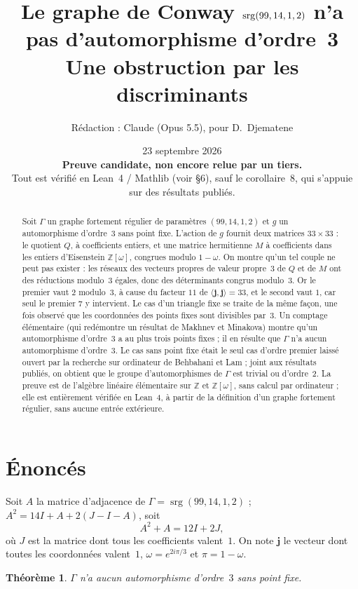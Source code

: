 \documentclass[11pt,a4paper]{article}
\title{Le graphe de Conway $\srg(99,14,1,2)$ n'a pas d'automorphisme d'ordre~3\\[3pt]
\large Une obstruction par les discriminants}
\author{Rédaction : Claude (Opus 5.5), pour D.~Djematene}
\date{23 septembre 2026 \\[4pt]
\textcolor{red!60!black}{\textbf{Preuve candidate, non encore relue par un tiers.}}\\[2pt]
\small Tout est vérifié en Lean~4 / Mathlib (voir §6), sauf le corollaire~8, qui s'appuie sur des résultats publiés.}
\newtheorem{theorem}{Théorème}
\theoremstyle{remark}
\newcommand{\Z}{\mathbb{Z}}
\newcommand{\one}{\mathbf{j}}
\newcommand{\srg}{\operatorname{srg}}
\begin{document}
\maketitle

\begin{abstract}
Soit $\Gamma$ un graphe fortement régulier de paramètres $(99,14,1,2)$ et $g$ un automorphisme d'ordre~3 sans point fixe.
L'action de $g$ fournit deux matrices $33\times 33$ : le quotient $Q$, à coefficients entiers, et une matrice hermitienne $M$ à
coefficients dans les entiers d'Eisenstein $\Z[\omega]$, congrues modulo $1-\omega$. On montre qu'un tel couple ne peut pas exister :
les réseaux des vecteurs propres de valeur propre~$3$ de $Q$ et de $M$ ont des réductions modulo~3 égales, donc des
déterminants congrus modulo~3. Or le premier vaut $2$ modulo~3, à cause du facteur $11$ de $\langle\one,\one\rangle=33$,
et le second vaut $1$, car seul le premier $7$ y intervient. Le cas d'un triangle fixe se traite de la même façon, une fois
observé que les coordonnées des points fixes sont divisibles par~3.
Un comptage élémentaire (qui redémontre un résultat de Makhnev et Minakova) montre qu'un automorphisme d'ordre~3 a au plus trois
points fixes ; il en résulte que $\Gamma$ n'a aucun automorphisme d'ordre~3.
Le cas sans point fixe était le seul cas d'ordre premier laissé ouvert par la recherche sur ordinateur de Behbahani et Lam ;
joint aux résultats publiés, on obtient que le groupe d'automorphismes de $\Gamma$ est trivial ou d'ordre~2.
La preuve est de l'algèbre linéaire élémentaire sur $\Z$ et $\Z[\omega]$, sans calcul par ordinateur ; elle est entièrement
vérifiée en Lean~4, à partir de la définition d'un graphe fortement régulier, sans aucune entrée extérieure.
\end{abstract}

\section{Énoncés}

Soit $A$ la matrice d'adjacence de $\Gamma=\srg(99,14,1,2)$ ; $A^2=14I+A+2(J-I-A)$, soit
\begin{equation}\label{eq:srg}
A^2+A=12I+2J ,
\end{equation}
où $J$ est la matrice dont tous les coefficients valent~$1$. On note $\one$ le vecteur dont toutes les coordonnées valent~$1$,
$\omega=e^{2i\pi/3}$ et $\pi=1-\omega$.

\begin{theorem}\label{thm:libre}
$\Gamma$ n'a aucun automorphisme d'ordre~$3$ sans point fixe.
\end{theorem}
\end{document}
